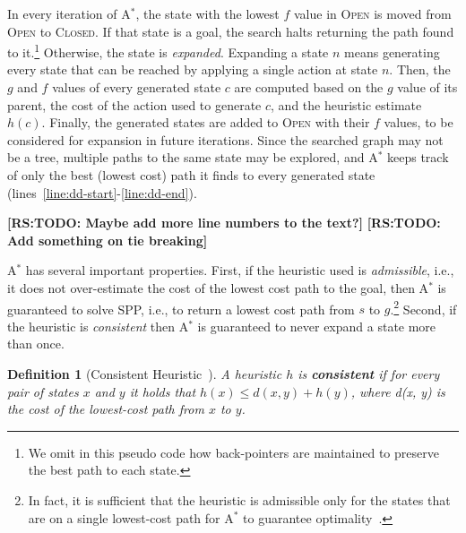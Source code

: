 \documentclass{aicom2e}
\newtheorem{definition}{Definition}
\newcommand{\astar}{A$^*$}
\newcommand{\open}{\textsc{Open}}
\newcommand{\closed}{\textsc{Closed}}
\newcommand{\roni}[1]{\textbf{[RS:#1]}}
\begin{document}
In every iteration of \astar{}, the state with the lowest $f$ value in \open{} is moved from \open{} to \closed{}. 
If that state is a goal, the search halts returning the path found to it.\footnote{We omit in this pseudo code how back-pointers are maintained to  preserve the best path to each state.} Otherwise, the state is {\em expanded}.  
Expanding a state $n$ means generating every state that can be reached by applying a single action at state $n$. 
Then, the $g$ and $f$ values of every generated state $c$ are computed based on the $g$ value of its parent, the cost of the action used to generate $c$, and the heuristic estimate $h(c)$. Finally, the generated states are added to \open{} with their $f$ values, to be considered for expansion in future iterations. Since the searched graph may not be a tree, multiple paths to the same state may be explored, and \astar{} keeps track of only the best (lowest cost) path it finds to every generated state (lines~\ref{line:dd-start}-\ref{line:dd-end}).  


\roni{TODO: Maybe add more line numbers to the text?}
\roni{TODO: Add something on tie breaking}

\astar{} has several important properties. First, if the heuristic used is {\em admissible}, i.e., it does not over-estimate the cost of the lowest cost path to the goal, then \astar{} is guaranteed to solve SPP, i.e., to return a lowest cost path from $s$ to $g$.\footnote{In fact, it is sufficient that the heuristic is admissible only for the states that are on a single lowest-cost path for \astar{} to guarantee optimality~\cite{karpas2012optimal,dechter1985generalizedBestFirst}.} 
Second, if the heuristic is {\em consistent} then \astar{} is guaranteed to never expand a state more than once. 
\begin{definition}[Consistent Heuristic~\cite{hartNR68Astar}]
	A heuristic $h$ is {\bf consistent} if for every pair of states $x$ and $y$  
	it holds that $h(x)\leq d(x,y)+h(y)$, where d(x, y) is
	the cost of the lowest-cost path from $x$ to $y$.
	\label{def:consistent}
\end{definition}
\end{document}
